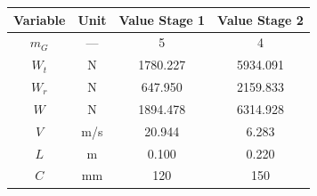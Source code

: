 \begin{tabular}{|c|c|c|c|}
\hline
Variable & Unit & Value Stage 1 & Value Stage 2 \\ \hline

$m_G$ & --- & 5 & 4 \\ \hline
$W_t$ & N & 1780.227 & 5934.091 \\ \hline
$W_r$ & N & 647.950 & 2159.833 \\ \hline
$W$ & N & 1894.478 & 6314.928 \\ \hline
$V$ & m/s & 20.944 & 6.283 \\ \hline
$L$ & m & 0.100 & 0.220 \\ \hline
$C$ & mm & 120 & 150 \\ \hline

\end{tabular}
